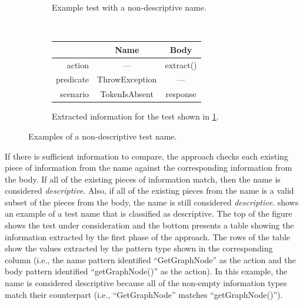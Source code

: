 \begin{figure}[t]
    \centering
    \begin{subfigure}{0.8\textwidth}
    \centering
        \caption{Example test with a non-descriptive name.}
        \label{PatternExample_detectedPoorName_code}
    \end{subfigure}
    \\[0.5ex]
    \begin{subfigure}{0.9\textwidth}
    \centering
        \begin{tabular}{rcc}
        \toprule
                  & Name           & Body      \\
        \midrule
        action    & ---            & extract() \\
        predicate & ThrowException & ---       \\
        scenario  & TokenIsAbsent  & response  \\
        \bottomrule
        \end{tabular}
        \caption{Extracted information for the test shown in \cref{PatternExample_detectedPoorName_code}.}
        \label{PatternExample_detectedPoorName}
    \end{subfigure}
    \caption{Examples of a non-descriptive test name.}
    \label{fig:non-descriptive-examples}
\end{figure}


If there is sufficient information to compare, the approach checks each existing piece of information from the name against the corresponding information from the body.
%
If all of the existing pieces of information match, then the name is considered \emph{descriptive}.
Also, if all of the existing pieces from the name is a valid subset of the pieces from the body, the name is still considered \emph{descriptive}.
%
 shows an example of a test name that is classified as descriptive.
%
The top of the figure shows the test under consideration and the bottom presents a table showing the information extracted by the first phase of the approach.
%
The rows of the table show the values extracted by the pattern type shown in the corresponding column (i.e., the name pattern identified \enquote{GetGraphNode} as the action and the body pattern identified \enquote{getGraphNode()} as the action).
%
In this example, the name is considered descriptive because all of the non-empty information types match their counterpart (i.e., \enquote{GetGraphNode} matches \enquote{getGraphNode()}).


